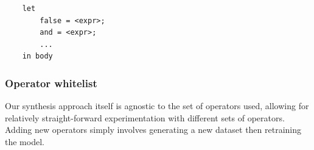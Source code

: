 \documentclass{article}
\begin{document}


\begin{verbatim}
    let
        false = <expr>;
        and = <expr>;
        ...
    in body
\end{verbatim}

\subsubsection{Operator whitelist}

Our synthesis approach itself is agnostic to the set of operators used,
allowing for relatively straight-forward experimentation with different sets of operators.
Adding new operators simply involves generating a new dataset then retraining the model.
\end{document}
